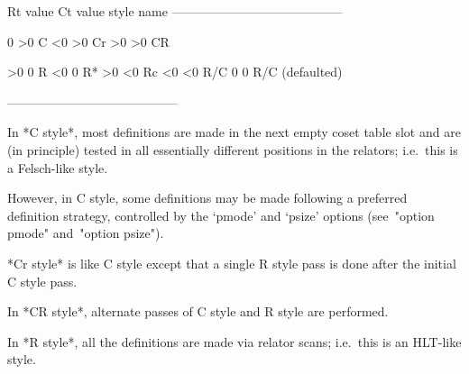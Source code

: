 \begintt
Rt value     Ct value     style name
-----------------------------------------

   0           >0         C
  <0           >0         Cr
  >0           >0         CR

  >0            0         R
  <0            0         R*
  >0           <0         Rc
  <0           <0         R/C
   0            0         R/C (defaulted)

-----------------------------------------
\endtt

In *C style*, most definitions are made  in
the next empty coset table slot and are (in principle) tested  in  all
essentially different  positions  in  the  relators;  i.e.~this  is  a
Felsch-like style.

However, in  C  style,  some  definitions  may  be  made  following  a
preferred definition strategy, controlled by the `pmode'  and  `psize'
options (see~"option pmode" and~"option psize").

*Cr style* is like C style except that  a
single R style pass is done after the initial C style pass.

In *CR style*,  alternate  passes  of  C
style and R style are performed.

In *R style*, all the definitions are  made
via relator scans; i.e.~this is an HLT-like style.


